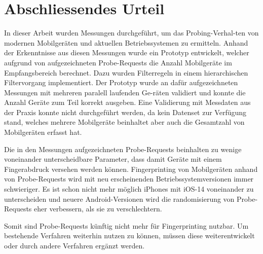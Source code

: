 \section{Abschliessendes Urteil}
In dieser Arbeit wurden Messungen durchgeführt, um das Probing-Verhal-ten von 
modernen Mobilgeräten und aktuellen Betriebssystemen zu ermitteln.
Anhand der Erkenntnisse aus diesen Messungen wurde ein Prototyp entwickelt, 
welcher aufgrund von aufgezeichneten Probe-Requests die Anzahl Mobilgeräte 
im Empfangsbereich berechnet. Dazu wurden Filterregeln in einem hierarchischen 
Filtervorgang implementiert. Der Prototyp wurde an dafür aufgezeichneten Messungen
mit mehreren paralell laufenden Ge-räten validiert und konnte die Anzahl Geräte
zum Teil korrekt ausgeben. Eine Validierung mit Messdaten aus der Praxis konnte 
nicht durchgeführt werden, da kein Datenset zur Verfügung stand, welches mehrere
Mobilgeräte beinhaltet aber auch die Gesamtzahl von Mobilgeräten erfasst hat.

Die in den Messungen aufgezeichneten Probe-Requests beinhalten zu wenige 
voneinander unterscheidbare Parameter, dass damit Geräte mit einem Fingerabdruck
versehen werden können. 
Fingerprinting von Mobilgeräten anhand von Probe-Requests wird mit neu 
erscheinenden Betriebssystemversionen immer schwieriger.
Es ist schon nicht mehr möglich iPhones mit iOS-14 voneinander zu unterscheiden 
und neuere Android-Versionen wird die randomisierung von Probe-Requests eher 
verbessern, als sie zu verschlechtern. 

Somit sind Probe-Requests künftig nicht mehr für Fingerprinting nutzbar.
Um bestehende Verfahren weiterhin nutzen zu können, müssen diese weiterentwickelt 
oder durch andere Verfahren ergänzt werden.